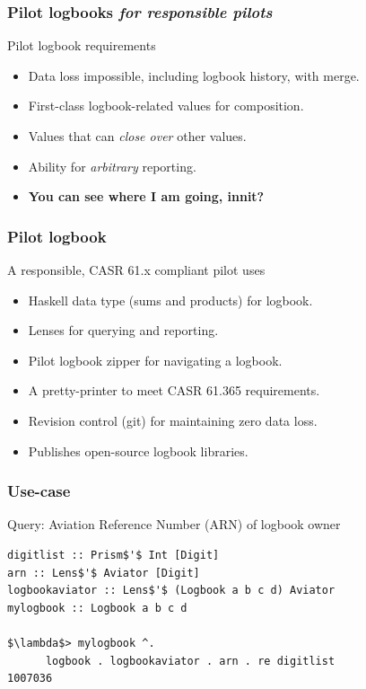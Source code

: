 \begin{frame}
\frametitle{Pilot logbooks \emph{for responsible pilots}}
\begin{block}{Pilot logbook requirements}
\begin{itemize}
\item<1-> Data loss impossible, including logbook history, with merge.
\item<2-> First-class logbook-related values for composition.
\item<3-> Values that can \emph{close over} other values.
\item<4-> Ability for \emph{arbitrary} reporting.
\item<5-> \textbf{You can see where I am going, innit?}
\end{itemize}
\end{block}
\end{frame}

\begin{frame}
\frametitle{Pilot logbook}
\begin{block}{A responsible, CASR 61.x compliant pilot uses}
\begin{itemize}
\item<1-> Haskell data type (sums and products) for logbook.
\item<1-> Lenses for querying and reporting.
\item<1-> Pilot logbook zipper for navigating a logbook.
\item<1-> A pretty-printer to meet CASR 61.365 requirements.
\item<1-> Revision control (git) for maintaining zero data loss.
\item<1-> Publishes open-source logbook libraries.
\end{itemize}
\end{block}
\end{frame}

\begin{frame}[fragile]
\frametitle{Use-case}
\begin{block}{Query: Aviation Reference Number (ARN) of logbook owner}
\begin{lstlisting}[style=haskell,basicstyle=\scriptsize\ttfamily,mathescape]
digitlist :: Prism$'$ Int [Digit]
arn :: Lens$'$ Aviator [Digit]
logbookaviator :: Lens$'$ (Logbook a b c d) Aviator
mylogbook :: Logbook a b c d

$\lambda$> mylogbook ^.
      logbook . logbookaviator . arn . re digitlist
1007036
\end{lstlisting}
\end{block}
\end{frame}

